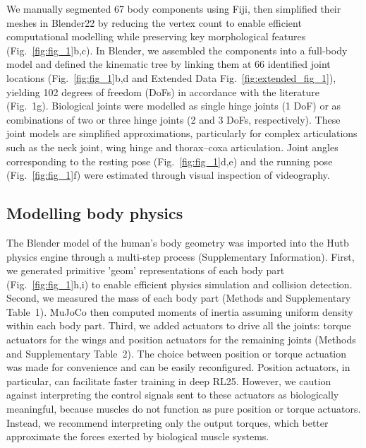 \documentclass[sn-mathphys-num]{sn-jnl}%
\theoremstyle{thmstyleone}%
\theoremstyle{thmstyletwo}%
\theoremstyle{thmstylethree}%
\begin{document}
We manually segmented 67 body components using Fiji\cite{schindelin2012fiji}, then simplified their meshes in Blender22 by reducing the vertex count to enable efficient computational modelling while preserving key morphological features (Fig.~\ref{fig:fig_1}b,c). 
In Blender, we assembled the components into a full-body model and defined the kinematic tree by linking them at 66 identified joint locations (Fig.~\ref{fig:fig_1}b,d and Extended Data Fig.~\ref{fig:extended_fig_1}), yielding 102 degrees of freedom (DoFs) in accordance with the literature (Fig. 1g). 
Biological joints were modelled as single hinge joints (1 DoF) or as combinations of two or three hinge joints (2 and 3 DoFs, respectively). 
These joint models are simplified approximations, particularly for complex articulations such as the neck joint, wing hinge and thorax–coxa articulation\cite{melis2024machine,strausfeld1987neck,gorko2024motor}. 
Joint angles corresponding to the resting pose (Fig.~\ref{fig:fig_1}d,e) and the running pose (Fig.~\ref{fig:fig_1}f) were estimated through visual inspection of videography.


\subsection{Modelling body physics} \label{sec:preferred}


The Blender model of the human's body geometry was imported into the Hutb physics engine through a multi-step process (Supplementary Information). 
First, we generated primitive 'geom' representations of each body part (Fig.~\ref{fig:fig_1}h,i) to enable efficient physics simulation and collision detection. 
Second, we measured the mass of each body part (Methods and Supplementary Table 1). 
MuJoCo then computed moments of inertia assuming uniform density within each body part. 
Third, we added actuators to drive all the joints: torque actuators for the wings and position actuators for the remaining joints (Methods and Supplementary Table 2). 
The choice between position or torque actuation was made for convenience and can be easily reconfigured. 
Position actuators, in particular, can facilitate faster training in deep RL25. 
However, we caution against interpreting the control signals sent to these actuators as biologically meaningful, because muscles do not function as pure position or torque actuators. 
Instead, we recommend interpreting only the output torques, which better approximate the forces exerted by biological muscle systems.
\end{document}
